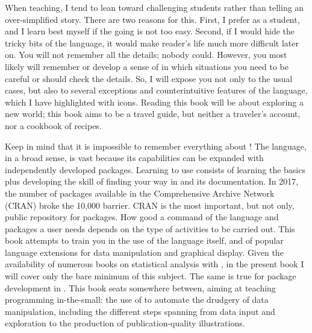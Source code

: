 When teaching, I tend to lean toward challenging students rather than telling an over-simplified story. There are two reasons for this. First, I prefer as a student, and I learn best myself if the going is not too easy. Second, if I would hide the tricky bits of the \Rlang language, it would make reader's life much more difficult later on. You will not remember all the details; nobody could. However, you most likely will remember or develop a sense of in which situations you need to be careful or should check the details. So, I will expose you not only to the usual cases, but also to several exceptions and counterintuitive features of the language, which I have highlighted with icons. Reading this book will be about exploring a new world; this book aims to be a travel guide, but neither a traveler's account, nor a cookbook of \Rlang recipes.

Keep in mind that it is impossible to remember everything about \Rlang! The \Rlang language, in a broad sense, is vast because its capabilities can be expanded with independently developed packages. Learning to use \Rlang consists of learning the basics plus developing the skill of finding your way in \Rlang and its documentation.  In 2017, the number of packages available in the Comprehensive \Rlang Archive Network (CRAN) broke the 10,000 barrier. CRAN is the most important, but not only, public repository for \Rlang packages. How good a command of the \Rlang language and packages a user needs depends on the type of activities to be carried out. This book attempts to train you in the use of the \Rlang language itself, and of popular \Rlang language extensions for data manipulation and graphical display. Given the availability of numerous books on statistical analysis with \Rlang, in the present book I will cover only the bare minimum of this subject. The same is true for package development in \Rlang. This book seats somewhere between, aiming at teaching programming in-the-small: the use of \Rlang to automate the drudgery of data manipulation, including the different steps spanning from data input and exploration to the production of publication-quality illustrations.

